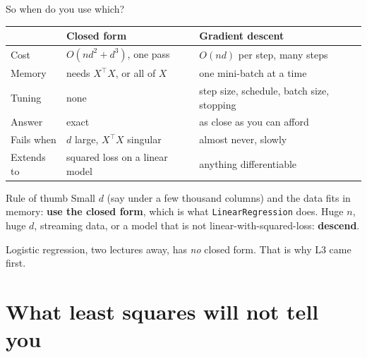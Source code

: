 \documentclass[aspectratio=169]{beamer}
\begin{document}
\begin{frame}[shrink=6]{So when do you use which?}
  \begin{center}\small
  \begin{tabular}{@{}lll@{}}
    \toprule
    & \textbf{Closed form} & \textbf{Gradient descent}\\
    \midrule
    Cost & $O(nd^2 + d^3)$, one pass & $O(nd)$ per step, many steps\\
    Memory & needs $X^{\!\top}\!X$, or all of $X$ & one mini-batch at a
      time\\
    Tuning & none & step size, schedule, batch size, stopping\\
    Answer & exact & as close as you can afford\\
    Fails when & $d$ large, $X^{\!\top}\!X$ singular & almost never, slowly\\
    Extends to & squared loss on a linear model & anything differentiable\\
    \bottomrule
  \end{tabular}
  \end{center}
  \vspace{0.2em}
  \begin{alertblock}{Rule of thumb}
    \small Small $d$ (say under a few thousand columns) and the data fits in
    memory: \textbf{use the closed form}, which is what
    \texttt{LinearRegression} does. Huge $n$, huge $d$, streaming data, or a
    model that is not linear-with-squared-loss: \textbf{descend}.
  \end{alertblock}
  \begin{center}\small
    Logistic regression, two lectures away, has \emph{no} closed form. That
    is why L3 came first.
  \end{center}
\end{frame}

\section[Cautions]{What least squares will not tell you}
\label{sec:caution}
\end{document}

